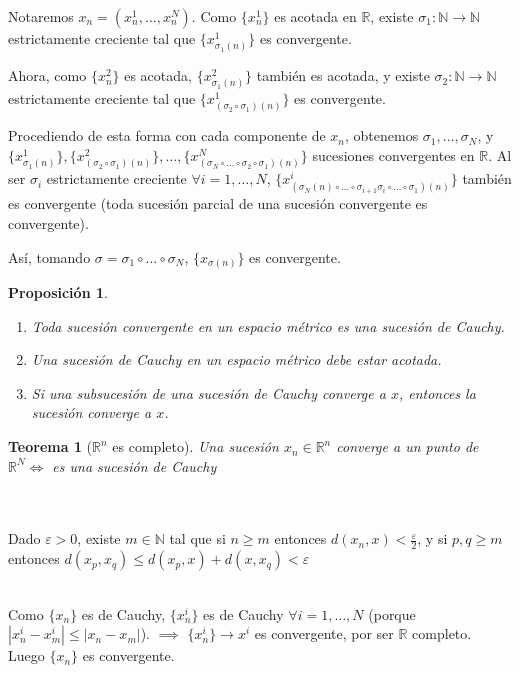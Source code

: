 \documentclass[11pt, a4paper]{article}
\makeatletter
\renewenvironment{proof}[1][\proofname] {\vspace{-15pt}\par\pushQED{\qed}\normalfont\topsep6\p@\@plus6\p@\relax\trivlist\item[\hskip\labelsep\it#1\@addpunct{.}]\ignorespaces}{\popQED\endtrivlist\@endpefalse}
\theoremstyle{theorem-style}
\newtheorem*{nth}{Teorema}
\newtheorem*{nprop}{Proposición}
\theoremstyle{definition-style}
\theoremstyle{remark-style}
\theoremstyle{example-style}
\newenvironment{nlist}
{\begin{enumerate}
\renewcommand\labelenumi{(\emph{\roman{enumi})}}}
{\end{enumerate}}
\makeatother
\begin{document}
\begin{proof}
	Notaremos $x_n = (x_n^1, \dots, x_n^N)$. Como $\{x_n^1\}$ es acotada en $\mathbb{R}$, existe $\sigma_1 : \mathbb{N} \rightarrow \mathbb{N}$ estrictamente creciente tal que $\{x_{\sigma_1(n)}^1\}$ es convergente.

Ahora, como $\{x_n^2\}$ es acotada, $\{x_{\sigma_1(n)}^2\}$ también es acotada, y existe $\sigma_2 : \mathbb{N} \rightarrow \mathbb{N}$ estrictamente creciente tal que $\{x_{(\sigma_2\circ\sigma_1)(n)}^1\}$ es convergente.

Procediendo de esta forma con cada componente de $x_n$, obtenemos $\sigma_1, \dots, \sigma_N$, y\\ $\{x_{\sigma_1(n)}^1\}, \{x_{(\sigma_2\circ\sigma_1)(n)}^2\}, \dots, \{x_{(\sigma_N\circ\dots\circ\sigma_2\circ\sigma_1)(n)}^N\}$ sucesiones convergentes en $\mathbb{R}$. Al ser $\sigma_i$ estrictamente creciente $\forall i=1,\dots,N$, $\{x_{(\sigma_N(n)\circ\dots\circ\sigma_{i+1}\sigma_i\circ\dots\circ\sigma_1)(n)}^i\}$ también es convergente (toda sucesión parcial de una sucesión convergente es convergente).

Así, tomando $\sigma = \sigma_1\circ\dots\circ\sigma_N$, $\{x_{\sigma(n)}\}$ es convergente.
\end{proof}

\begin{nprop}\hfill\\
	\begin{nlist}
	\item Toda sucesión convergente en un espacio métrico es una sucesión de Cauchy.
	\item Una sucesión de Cauchy en un espacio métrico debe estar acotada.
	\item Si una subsucesión de una sucesión de Cauchy converge a $x$, entonces la sucesión converge a $x$.
\end{nlist}
\end{nprop}

\begin{nth}[$\mathbb{R}^n$ es completo]
	Una sucesión $x_n\in \mathbb{R}^n$ converge a un punto de $\mathbb{R}^N \iff $ es una sucesión de Cauchy
\end{nth}
\begin{proof}\hfill\\
\boxed{\Leftarrow}\\
Dado $\varepsilon > 0$, existe $m\in \mathbb{N}$ tal que si $n \ge m$ entonces $d(x_n, x) < \displaystyle\frac{\varepsilon}{2}$, y si $p,q \ge m$ entonces $d(x_p, x_q) \le d(x_p, x) + d(x, x_q) < \varepsilon $


	\boxed{\Rightarrow}\\
Como $\{x_n\}$ es de Cauchy, $\{x_n^i\}$ es de Cauchy $\forall i = 1,\dots,N$ (porque $|x_n^i-x_m^i| \le |x_n-x_m|$). $\implies$ $\{x_n^i\}\rightarrow x^i$ es convergente, por ser $\mathbb{R}$ completo. Luego $\{x_n\}$ es convergente.


\end{proof}
\end{document}
